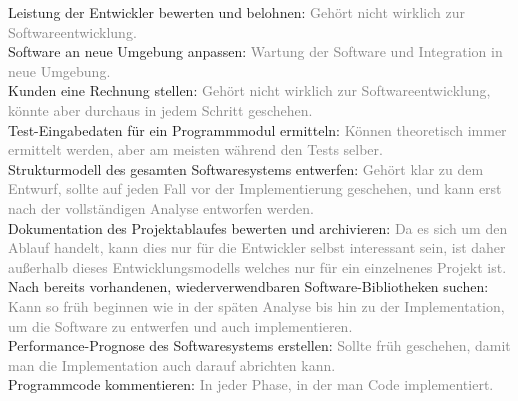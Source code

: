 \documentclass[a4paper,11pt]{scrartcl}
\begin{document}
	Leistung der Entwickler bewerten und belohnen: \textcolor{gray}{Gehört nicht wirklich zur Softwareentwicklung.}\\
	Software an neue Umgebung anpassen: \textcolor{gray}{Wartung der Software und Integration in neue Umgebung.}\\		
	Kunden eine Rechnung stellen: \textcolor{gray}{Gehört nicht wirklich zur Softwareentwicklung, könnte aber durchaus in jedem Schritt geschehen.}\\				
	Test-Eingabedaten für ein Programmmodul ermitteln: \textcolor{gray}{Können theoretisch immer ermittelt werden, aber am meisten während den Tests selber.}\\	
	Strukturmodell des gesamten Softwaresystems entwerfen: \textcolor{gray}{Gehört klar zu dem Entwurf, sollte auf jeden Fall vor der Implementierung geschehen, und kann erst nach der vollständigen Analyse entworfen werden.}\\
	Dokumentation des Projektablaufes bewerten und archivieren: \textcolor{gray}{Da es sich um den Ablauf handelt, kann dies nur für die Entwickler selbst interessant sein, ist daher außerhalb dieses Entwicklungsmodells welches nur für ein einzelnenes Projekt ist.}\\	
	Nach bereits vorhandenen, wiederverwendbaren Software-Bibliotheken suchen: \textcolor{gray}{Kann so früh beginnen wie in der späten Analyse bis hin zu der Implementation, um die Software zu entwerfen und auch implementieren.}\\
	Performance-Prognose des Softwaresystems erstellen: \textcolor{gray}{Sollte früh geschehen, damit man die Implementation auch darauf abrichten kann.}\\
	Programmcode kommentieren: \textcolor{gray}{In jeder Phase, in der man Code implementiert.}\\
	
	\newpage	
	
\end{document}
